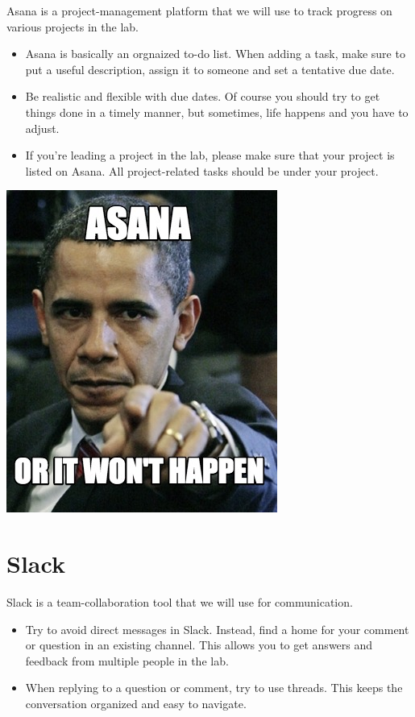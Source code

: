 \documentclass[]{book}
\providecommand{\tightlist}{%
  \setlength{\itemsep}{0pt}\setlength{\parskip}{0pt}}
\begin{document}
Asana is a project-management platform that we will use to track progress on various projects in the lab.

\begin{itemize}
\tightlist
\item
  Asana is basically an orgnaized to-do list. When adding a task, make sure to put a useful description, assign it to someone and set a tentative due date.\\
\item
  Be realistic and flexible with due dates. Of course you should try to get things done in a timely manner, but sometimes, life happens and you have to adjust.\\
\item
  If you're leading a project in the lab, please make sure that your project is listed on Asana. All project-related tasks should be under your project.
\end{itemize}

\includegraphics{images/asana.jpg}

\hypertarget{slack}{%
\section{Slack}\label{slack}}

Slack is a team-collaboration tool that we will use for communication.

\begin{itemize}
\tightlist
\item
  Try to avoid direct messages in Slack. Instead, find a home for your comment or question in an existing channel. This allows you to get answers and feedback from multiple people in the lab.\\
\item
  When replying to a question or comment, try to use threads. This keeps the conversation organized and easy to navigate.
\end{itemize}
\end{document}
